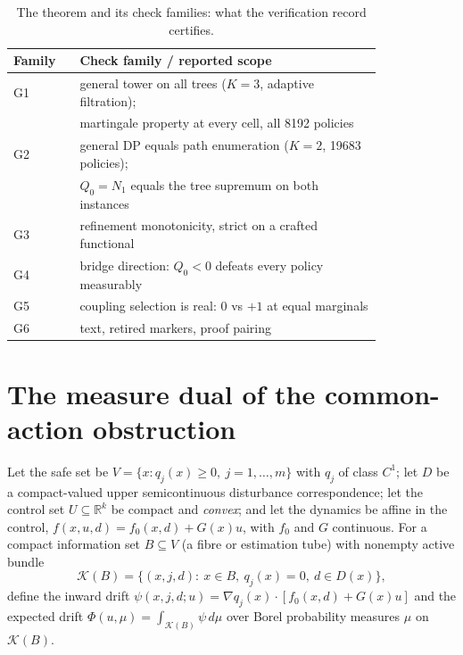 \documentclass[10pt,twocolumn]{article}
\theoremstyle{definition}
\begin{document}
\begin{table}[h]
\centering\footnotesize
\caption{The theorem and its check families: what the verification record
certifies.}
\label{tab:checks}
\begin{tabular}{@{}l p{0.82\linewidth}@{}}
\toprule
Family & Check family / reported scope \\
\midrule
G1 & general tower on all trees ($K{=}3$, adaptive filtration); \\
   & martingale property at every cell, all 8192 policies \\
G2 & general DP equals path enumeration ($K{=}2$, 19683 policies); \\
   & $Q_0 = N_1$ equals the tree supremum on both instances \\
G3 & refinement monotonicity, strict on a crafted functional \\
G4 & bridge direction: $Q_0 < 0$ defeats every policy measurably \\
G5 & coupling selection is real: $0$ vs $+1$ at equal marginals \\
G6 & text, retired markers, proof pairing \\
\bottomrule
\end{tabular}
\end{table}

\section{The measure dual of the common-action obstruction}

Let the safe set be $V = \{x: q_{j}(x) \ge 0,\ j = 1,\dots,m\}$ with
$q_{j}$ of class $C^{1}$; let $D$ be a compact-valued upper
semicontinuous disturbance correspondence; let the control set
$U \subseteq \mathbb{R}^{k}$ be compact and \emph{convex}; and let the
dynamics be affine in the control,
$f(x,u,d) = f_{0}(x,d) + G(x)u$, with $f_{0}$ and $G$ continuous. For a
compact information set $B \subseteq V$ (a fibre or estimation tube) with
nonempty active bundle
\[
\mathcal{K}(B) = \{(x,j,d):\ x \in B,\ q_{j}(x) = 0,\ d \in D(x)\},
\]
define the inward drift
$\psi(x,j,d;u) = \nabla q_{j}(x)\cdot[f_{0}(x,d) + G(x)u]$ and the
expected drift $\Phi(u,\mu) = \int_{\mathcal{K}(B)} \psi \,d\mu$ over
Borel probability measures $\mu$ on $\mathcal{K}(B)$.
\end{document}
